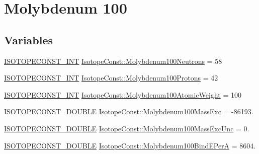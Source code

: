 \hypertarget{group___isotope_const-_molybdenum-_mo100}{}\section{Molybdenum 100}
\label{group___isotope_const-_molybdenum-_mo100}
\subsection*{Variables}
\begin{DoxyCompactItemize}
\item 
\mbox{\hyperlink{group___isotope_const-_macros_ga5f18360b3e99483a35c32d789e62621c}{I\+S\+O\+T\+O\+P\+E\+C\+O\+N\+S\+T\+\_\+\+I\+NT}} \mbox{\hyperlink{group___isotope_const-_molybdenum-_mo100_gad68e5d908ed30ff2b4a11ca0c8eb0a54}{Isotope\+Const\+::\+Molybdenum100\+Neutrons}} = 58
\item 
\mbox{\hyperlink{group___isotope_const-_macros_ga5f18360b3e99483a35c32d789e62621c}{I\+S\+O\+T\+O\+P\+E\+C\+O\+N\+S\+T\+\_\+\+I\+NT}} \mbox{\hyperlink{group___isotope_const-_molybdenum-_mo100_ga68781c237b3e0ff958a17bc422398906}{Isotope\+Const\+::\+Molybdenum100\+Protons}} = 42
\item 
\mbox{\hyperlink{group___isotope_const-_macros_ga5f18360b3e99483a35c32d789e62621c}{I\+S\+O\+T\+O\+P\+E\+C\+O\+N\+S\+T\+\_\+\+I\+NT}} \mbox{\hyperlink{group___isotope_const-_molybdenum-_mo100_ga47add7a01f8291960c4c96741588d5f2}{Isotope\+Const\+::\+Molybdenum100\+Atomic\+Weight}} = 100
\item 
\mbox{\hyperlink{group___isotope_const-_macros_ga8f45a7272ce02c0b4c65c44636ed719a}{I\+S\+O\+T\+O\+P\+E\+C\+O\+N\+S\+T\+\_\+\+D\+O\+U\+B\+LE}} \mbox{\hyperlink{group___isotope_const-_molybdenum-_mo100_gaeeed4e5cee3cdc7f571f3f7c477ad178}{Isotope\+Const\+::\+Molybdenum100\+Mass\+Exc}} = -\/86193.
\item 
\mbox{\hyperlink{group___isotope_const-_macros_ga8f45a7272ce02c0b4c65c44636ed719a}{I\+S\+O\+T\+O\+P\+E\+C\+O\+N\+S\+T\+\_\+\+D\+O\+U\+B\+LE}} \mbox{\hyperlink{group___isotope_const-_molybdenum-_mo100_ga4d82b6327aa8e0b1b14bb894fc22566a}{Isotope\+Const\+::\+Molybdenum100\+Mass\+Exc\+Unc}} = 0.
\item 
\mbox{\hyperlink{group___isotope_const-_macros_ga8f45a7272ce02c0b4c65c44636ed719a}{I\+S\+O\+T\+O\+P\+E\+C\+O\+N\+S\+T\+\_\+\+D\+O\+U\+B\+LE}} \mbox{\hyperlink{group___isotope_const-_molybdenum-_mo100_ga4ccee67b5ce4de1594c3f4afba0d0e9f}{Isotope\+Const\+::\+Molybdenum100\+Bind\+E\+PerA}} = 8604.

\end{DoxyCompactItemize}
